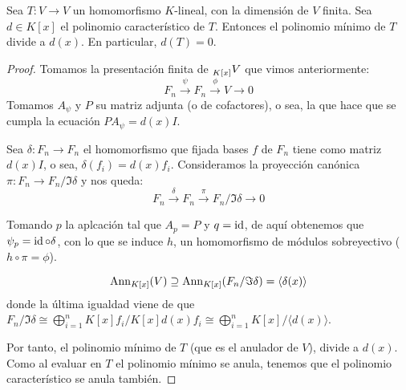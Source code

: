 \begin{prop}
  Sea \(T:V\longrightarrow V\) un homomorfismo \(K\)-lineal, con
  la dimensión de \(V\) finita. Sea \(d\in K[x]\) el polinomio característico
  de \(T\). Entonces el polinomio mínimo de \(T\) divide a \(d(x)\).
  En particular, \(d(T)=0\).
\end{prop}
\begin{proof}
  Tomamos la presentación finita de \(\prescript{}{K[x]}{V}\) que
  vimos anteriormente:
  \[
    F_n\overset{\psi}{\longrightarrow} F_n
    \overset{\phi}{\longrightarrow} V\longrightarrow 0
  \]
  Tomamos \(A_\psi\) y \(P\) su matriz adjunta (o de cofactores), o sea,
  la que hace que se cumpla la ecuación \(PA_\psi=d(x)I\).

  Sea \(\delta:F_n\longrightarrow F_n\) el homomorfismo que fijada
  bases \(f\) de \(F_n\) tiene como matriz \(d(x)I\), o sea,
  \(\delta(f_i)=d(x)f_i\). Consideramos la proyección canónica
  \(\pi:F_n\longrightarrow F_n/\Im\delta\) y nos queda:
  \[
    F_n\overset{\delta}{\longrightarrow} F_n
    \overset{\pi}{\longrightarrow} F_n/\Im\delta\longrightarrow 0
  \]

  Tomando \(p\) la aplcación tal que \(A_p=P\) y \(q=\operatorname{id}\), de aquí
  obtenemos que \(\psi_p=\operatorname{id}\circ\delta\), con lo que se induce \(h\),
  un homomorfismo de módulos sobreyectivo (\(h\circ\pi=\phi\)).

  \[
    \operatorname{Ann}_{K[x]}(V)\supseteq\operatorname{Ann}_{K[x]}(F_n/\Im\delta)=\langle\delta(x)\rangle
  \]
  donde la última igualdad viene de que \(F_n/\Im\delta\cong
  \bigoplus_{i=1}^n K[x]f_i/K[x]d(x)f_i\cong
  \bigoplus_{i=1}^n K[x]/\langle d(x)\rangle\).

  Por tanto, el polinomio mínimo de \(T\) (que es el anulador de \(V\)),
  divide a \(d(x)\). Como al evaluar en \(T\) el polinomio mínimo se anula,
  tenemos que el polinomio característico se anula también.

\end{proof}



